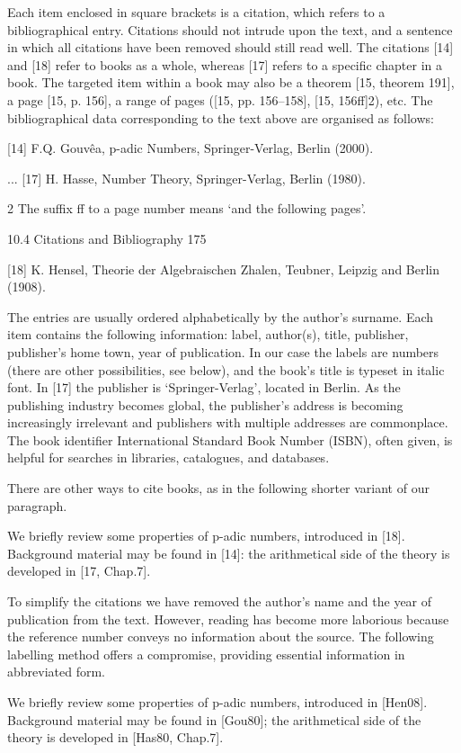 \documentclass[11pt]{article}
\theoremstyle{plain}
\theoremstyle{definition}
\begin{document}
Each item enclosed in square brackets is a citation, which refers to a bibliographical entry. Citations should not intrude upon the text, and a sentence in which all citations have been removed should still read well. The citations [14] and [18] refer to books as a whole, whereas [17] refers to a specific chapter in a book. The targeted item within a book may also be a theorem [15, theorem 191], a page [15, p. 156], a range of pages ([15, pp. 156--158], [15, 156ff]2), etc. The bibliographical data corresponding to the text above are organised as follows:

[14] F.Q. Gouvêa, p-adic Numbers, Springer-Verlag, Berlin (2000).

... [17] H. Hasse, Number Theory, Springer-Verlag, Berlin (1980).

2 The suffix ff to a page number means `and the following pages'.

10.4 Citations and Bibliography 175

[18] K. Hensel, Theorie der Algebraischen Zhalen, Teubner, Leipzig and Berlin (1908).

The entries are usually ordered alphabetically by the author's surname. Each item contains the following information: label, author(s), title, publisher, publisher's home town, year of publication. In our case the labels are numbers (there are other possibilities, see below), and the book's title is typeset in italic font. In [17] the publisher is `Springer-Verlag', located in Berlin. As the publishing industry becomes global, the publisher's address is becoming increasingly irrelevant and publishers with multiple addresses are commonplace. The book identifier International Standard Book Number (ISBN), often given, is helpful for searches in libraries, catalogues, and databases.

There are other ways to cite books, as in the following shorter variant of our paragraph.

We briefly review some properties of p-adic numbers, introduced in [18]. Background material may be found in [14]: the arithmetical side of the theory is developed in [17, Chap.7].

To simplify the citations we have removed the author's name and the year of publication from the text. However, reading has become more laborious because the reference number conveys no information about the source. The following labelling method offers a compromise, providing essential information in abbreviated form.

We briefly review some properties of p-adic numbers, introduced in [Hen08]. Background material may be found in [Gou80]; the arithmetical side of the theory is developed in [Has80, Chap.7].
\end{document}
